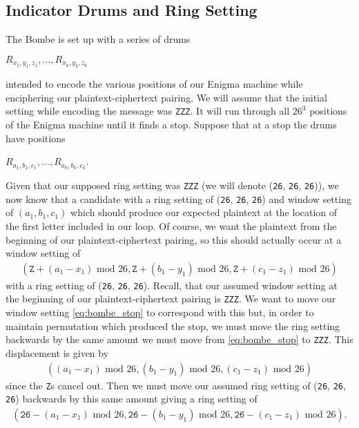 \subsection{Indicator Drums and Ring Setting}
The Bombe is set up with a series of drums
\begin{center}
	$R_{x_1, y_1, z_1},\dots, R_{x_k, y_k, z_k}$
\end{center}
intended to encode the various positions of our Enigma machine while enciphering our plaintext-ciphertext pairing. We will assume that the initial setting while encoding the message was \texttt{ZZZ}. It will run through all $26^3$ positions of the Enigma machine until it finds a stop. Suppose that at a stop the drums have positions
\begin{center}
	$R_{a_1, b_1, c_1},\dots, R_{a_k, b_k, c_k}$.
\end{center}
Given that our supposed ring setting was \texttt{ZZZ} (we will denote (\texttt{26},
\texttt{26}, \texttt{26})), we now know that a candidate with a ring setting of (\texttt{26},
\texttt{26}, \texttt{26}) and window setting of $(a_1, b_1, c_1)$ which should produce our expected plaintext at the location of the first letter included in our loop. Of course, we want the plaintext from the beginning of our plaintext-ciphertext pairing, so this should actually occur at a window setting of
\begin{align}
	\label{eq:bombe_stop}
	(\texttt{Z} + (a_1-x_1)\text{ mod }26, \texttt{Z} + (b_1-y_1)\text{ mod }26, \texttt{Z} + (c_1-z_1)\text{ mod }26)
\end{align}
with a ring setting of (\texttt{26},
\texttt{26}, \texttt{26}). Recall, that our assumed window setting at the beginning of our plaintext-ciphertext pairing is \texttt{ZZZ}. We want to move our window setting \ref{eq:bombe_stop} to correspond with this but, in order to maintain permutation which produced the stop, we must move the ring setting backwards by the same amount we must move from \ref{eq:bombe_stop} to \texttt{ZZZ}. This displacement is given by
\begin{align*}
	((a_1-x_1)\text{ mod }26, (b_1-y_1)\text{ mod }26, (c_1-z_1)\text{ mod }26)
\end{align*}
since the \texttt{Z}s cancel out. Then we must move our assumed ring setting of (\texttt{26},
\texttt{26}, \texttt{26}) backwards by this same amount giving a ring setting of
\begin{align*}
	(\texttt{26} - (a_1-x_1)\text{ mod }26, \texttt{26} - (b_1-y_1)\text{ mod }26, \texttt{26} - (c_1-z_1)\text{ mod }26).
\end{align*}
